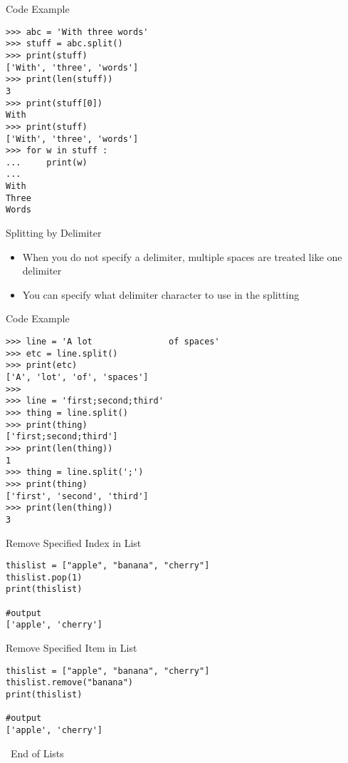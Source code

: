 \documentclass[serif, aspectratio=169]{beamer}
\begin{document}
\begin{frame}[fragile]{Code Example}
    \begin{lstlisting}
>>> abc = 'With three words'
>>> stuff = abc.split()
>>> print(stuff)
['With', 'three', 'words']
>>> print(len(stuff))
3
>>> print(stuff[0])
With
>>> print(stuff)
['With', 'three', 'words']
>>> for w in stuff :
...     print(w)
...
With
Three
Words
    \end{lstlisting}
\end{frame}


\begin{frame}{Splitting by Delimiter}
    \begin{itemize}
        \item When you do not specify a delimiter, multiple spaces are treated like one delimiter
       \item You can specify what delimiter character to use in the splitting
    \end{itemize}
\end{frame}

\begin{frame}[fragile]{Code Example}
    \begin{lstlisting}
>>> line = 'A lot               of spaces'
>>> etc = line.split()
>>> print(etc)
['A', 'lot', 'of', 'spaces']
>>>
>>> line = 'first;second;third'
>>> thing = line.split()
>>> print(thing)
['first;second;third']
>>> print(len(thing))
1
>>> thing = line.split(';')
>>> print(thing)
['first', 'second', 'third']
>>> print(len(thing))
3
    \end{lstlisting}
\end{frame}

\begin{frame}[fragile]{Remove Specified Index in List}
    \begin{lstlisting}
thislist = ["apple", "banana", "cherry"]
thislist.pop(1)
print(thislist)

#output
['apple', 'cherry']
    \end{lstlisting}
\end{frame}

\begin{frame}[fragile]{Remove Specified Item in List}
    \begin{lstlisting}
thislist = ["apple", "banana", "cherry"]
thislist.remove("banana")
print(thislist)

#output
['apple', 'cherry']
    \end{lstlisting}
\end{frame}

\begin{frame}
    \begin{center}
        {\Huge\ End of Lists}
    \end{center}
\end{frame}
\end{document}
